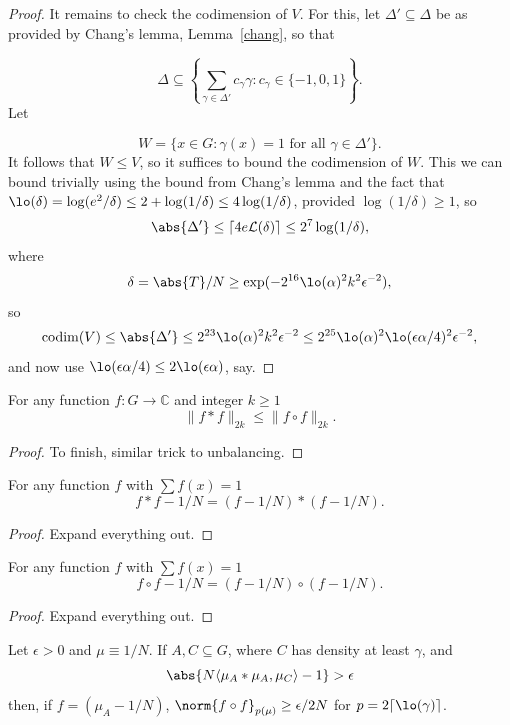 \begin{proof}
It remains to check the codimension of $V$. For this, let $\Delta'\subseteq \Delta$ be as provided by Chang's lemma, Lemma~\ref{chang}, so that

\[\Delta\subseteq \left\{ \sum_{\gamma\in\Delta'}c_\gamma \gamma : c_\gamma\in \{-1,0,1\} \right\}.\]
Let

\[W= \{ x \in G : \gamma(x)=1\textrm{ for all }\gamma\in\Delta'\}.\]
It follows that $W\leq V$, so it suffices to bound the codimension of $W$. This we can bound trivially using the bound from Chang's lemma and the fact that $\lo(\delta)=\log(e^2/\delta)\leq 2+\log(1/\delta)\leq 4\log(1/\delta)$, provided $\log(1/\delta)\geq 1$, so
\[\abs{\Delta'}\leq  \lceil 4e\mathcal{L}(\delta)\rceil\leq 2^7\log(1/\delta),\]
where
\[\delta=\abs{T}/N\geq \exp(-2^{16}\lo(\alpha)^2k^2\epsilon^{-2}),\]
so
\[\mathrm{codim}(V)\leq \abs{\Delta'}\leq 2^{23}\lo(\alpha)^2k^2\epsilon^{-2}\leq 2^{25}\lo(\alpha)^2\lo(\epsilon \alpha/4)^2\epsilon^{-2},\]
and now use $\lo(\epsilon\alpha/4)\leq 2\lo(\epsilon\alpha)$, say.
\end{proof}


\begin{lemma}
\label{ast_le_circ}
\leanok
For any function $f:G\to \mathbb{C}$ and integer $k\geq 1$
\[\| f\ast f\|_{2k}\leq \| f\circ f\|_{2k}.\]
\end{lemma}

\begin{proof}
\leanok
To finish, similar trick to unbalancing.
\end{proof}


\begin{lemma}\label{ast_expand}
\leanok
For any function $f$ with $\sum f(x)=1$
\[f\ast f-1/N = (f-1/N)\ast (f-1/N).\]
\end{lemma}

\begin{proof}
\leanok
Expand everything out.
\end{proof}


\begin{lemma}\label{circ_expand}
\leanok
For any function $f$ with $\sum f(x)=1$
\[f\circ f-1/N = (f-1/N)\circ (f-1/N).\]
\end{lemma}

\begin{proof}
\leanok
Expand everything out.
\end{proof}


\begin{lemma}
\label{global_dichotomy}
\leanok
Let $\epsilon >0$ and $\mu\equiv 1/N$. If $A,C\subseteq G$, where $C$ has density at least $\gamma$, and
\[\abs{N\langle \mu_A\ast \mu_A,\mu_C\rangle -1}>\epsilon\]
then, if $f=(\mu_A-1/N)$, $\norm{f\circ f}_{p(\mu)} \geq \epsilon /2N$ for $p=2\lceil \lo(\gamma)\rceil$.
\end{lemma}

